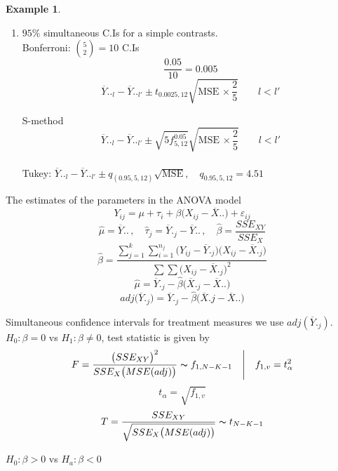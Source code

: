 \documentclass[11pt,a4paper]{article}
\theoremstyle{definition}
\newtheorem{exa}[thm]{Example}
\begin{document}
\begin{exa}
\begin{enumerate}
\item $95\%$ simultaneous C.Is for a simple contrasts.\\

Bonferroni: $\displaystyle{\binom{5}{2}=10}$ C.Is
$$\frac{0.05}{10}=0.005$$ 
$$\overline{Y}.._l-\overline{Y}.._{l'}\pm t_{0.0025,12}\sqrt{\text{MSE}\,\times \frac{2}{5}}\qquad  l<l'$$


S-method
$$\overline{Y}.._l-\overline{Y}.._{l'} \pm \sqrt{5 f_{5,12}^{0.05}}\sqrt{\text{MSE}\,\times \frac{2}{5}}\qquad  l<l'$$\\

Tukey: $\displaystyle{\overline{Y}.._l-\overline{Y}.._{l'}\pm q_{(0.95,5,12)}\sqrt{\text{MSE}}},\quad  q_{0.95,5,12}=4.51$\\
\end{enumerate}


The estimates of the parameters in the ANOVA model $$Y_{ij} =\mu + \tau_i + \beta \big(X_{ij}-\overline{X}..\big) +\varepsilon_{ij}$$
$$\widehat{\mu} =\overline{Y}..\, , \quad  \widehat{\tau}_j=\overline{Y}._j-\overline{Y}..\, ,\quad  \widehat{\beta}=\frac{SSE_{XY}}{SSE_X}$$
$$\widehat{\beta}=\frac{\displaystyle{\sum^k_{j=1}\sum^{n_j}_{i=1}\big(Y_{ij}-\overline{Y}._j\big)\big(X_{ij}-\overline{X}._j\big)}}{\displaystyle{\sum \sum \big(X_{ij}-\overline{X}._j\big)^2}}$$
$$\widehat{\mu} = \overline{Y}._j-\widehat{\beta}\big(\overline{X}._j-\overline{X}..\big)$$
$$adj\big(\overline{Y}._j\big) = \overline{Y}._j - \widehat{\beta}\big(\overline{X}.j-\overline{X}..\big)$$

Simultaneous confidence intervals for treatment measures we use $adj(\overline{Y}._j)$.\\

$H_0:\beta = 0$ vs $H_1: \beta \neq 0$, test statistic is given by $$F=\frac{\big(SSE_{XY}\big)^2}{SSE_{X}\big(MSE(adj)\big)}\thicksim f_{1,N-K-1}\quad  \Bigg|\quad  f_{1,v}=t^2_{\alpha}$$
$$t_{\alpha} = \sqrt{f_{1,v}}$$
$$T=\frac{SSE_{XY}}{\sqrt{SSE_X\big(MSE(adj)\big)}}\thicksim t_{N-K-1}$$


$H_0:\beta >0$ vs $H_a: \beta <0$
\end{exa}
\end{document}
